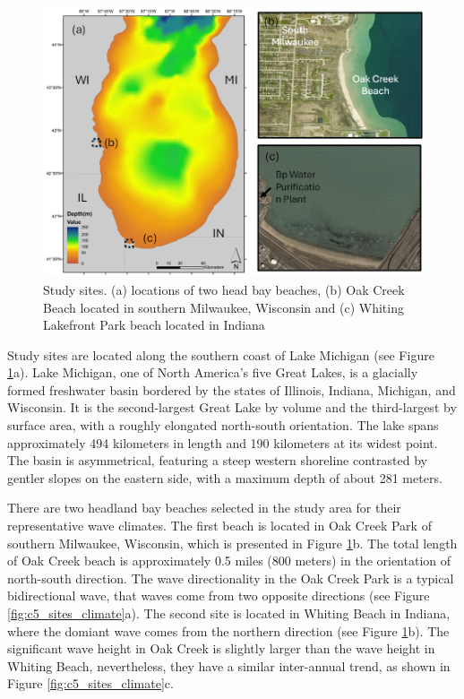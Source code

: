 \begin{figure}[htbp]
  \centering
  \includegraphics[width=1\textwidth]{chapter5/resources/study_sites.png}
  \caption{Study sites. (a) locations of two head bay beaches, (b) Oak Creek
  Beach located in southern Milwaukee, Wisconsin and (c) Whiting Lakefront Park
  beach located in Indiana}
  \label{fig:c5_study_sites}
\end{figure}

Study sites are located along the southern coast of Lake Michigan (see Figure
\ref{fig:c5_study_sites}a). Lake Michigan, one of North America's five Great
Lakes, is a glacially formed freshwater basin bordered by the states of
Illinois, Indiana, Michigan, and Wisconsin. It is the second-largest Great Lake
by volume and the third-largest by surface area, with a roughly elongated
north-south orientation.  The lake spans approximately 494 kilometers in length
and 190 kilometers at its widest point. The basin is asymmetrical, featuring a
steep western shoreline contrasted by gentler slopes on the eastern side, with a
maximum depth of about 281 meters.

There are two headland bay beaches selected in the study area for their
representative wave climates. The first beach is located in Oak Creek Park of
southern Milwaukee, Wisconsin, which is presented in Figure
\ref{fig:c5_study_sites}b. The total length of Oak Creek beach is approximately
0.5 miles (800 meters) in the orientation of north-south direction. The wave
directionality in the Oak Creek Park is a typical bidirectional wave, that waves
come from two opposite directions (see Figure \ref{fig:c5_sites_climate}a). The
second site is located in Whiting Beach in Indiana, where the domiant wave comes
from the northern direction (see Figure \ref{fig:c5_study_sites}b). The
significant wave height in Oak Creek is slightly larger than the wave height in
Whiting Beach, nevertheless, they have a similar inter-annual trend, as shown in
Figure \ref{fig:c5_sites_climate}c.  

